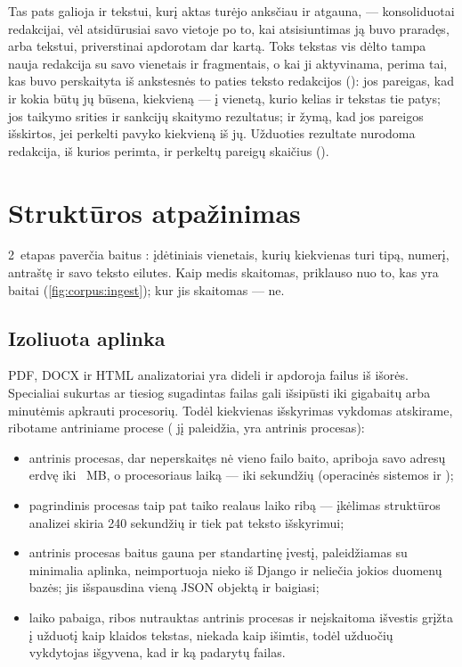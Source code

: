 Tas pats galioja ir tekstui, kurį aktas turėjo anksčiau ir atgauna, --- konsoliduotai
redakcijai, vėl atsidūrusiai savo vietoje po to, kai atsisiuntimas ją buvo praradęs, arba
tekstui, priverstinai apdorotam dar kartą. Toks tekstas vis dėlto tampa nauja redakcija su
savo vienetais ir fragmentais, o kai ji aktyvinama, perima tai, kas buvo perskaityta iš
ankstesnės to paties teksto redakcijos (): jos pareigas, kad ir kokia būtų jų
būsena, kiekvieną --- į vienetą, kurio kelias ir tekstas tie patys; jos taikymo srities ir
sankcijų skaitymo rezultatus; ir žymą, kad jos pareigos išskirtos, jei perkelti pavyko
kiekvieną iš jų. Užduoties rezultate nurodoma redakcija, iš kurios perimta, ir perkeltų
pareigų skaičius ().


\section{Struktūros atpažinimas}\label{sec:corpus:parse}

2~etapas paverčia baitus : įdėtiniais vienetais, kurių kiekvienas turi
tipą, numerį, antraštę ir savo teksto eilutes. Kaip medis skaitomas, priklauso nuo to, kas yra
baitai (\cref{fig:corpus:ingest}); kur jis skaitomas --- ne.

\subsection{Izoliuota aplinka}\label{sec:corpus:sandbox}

PDF, DOCX ir HTML analizatoriai yra dideli ir apdoroja failus iš išorės. Specialiai sukurtas
ar tiesiog sugadintas failas gali išsipūsti iki gigabaitų arba minutėmis apkrauti procesorių.
Todėl kiekvienas išskyrimas vykdomas atskirame, ribotame antriniame procese
( jį paleidžia,  yra antrinis procesas):

\begin{itemize}
  \item antrinis procesas, dar neperskaitęs nė vieno failo baito, apriboja savo adresų erdvę
    iki ~MB, o procesoriaus laiką --- iki 
    sekundžių (operacinės sistemos  ir );
  \item pagrindinis procesas taip pat taiko realaus laiko ribą --- įkėlimas struktūros
    analizei skiria 240 sekundžių ir tiek pat teksto išskyrimui;
  \item antrinis procesas baitus gauna per standartinę įvestį, paleidžiamas su minimalia
    aplinka, neimportuoja nieko iš Django ir neliečia jokios duomenų bazės; jis išspausdina
    vieną JSON objektą ir baigiasi;
  \item laiko pabaiga, ribos nutrauktas antrinis procesas ir neįskaitoma išvestis grįžta į
    užduotį kaip klaidos tekstas, niekada kaip išimtis, todėl užduočių vykdytojas išgyvena,
    kad ir ką padarytų failas.
\end{itemize}

